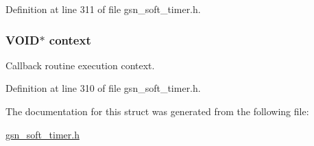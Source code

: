 Definition at line 311 of file gsn\_\-soft\_\-timer.h.

\hypertarget{a00228_a7e5a25499bcd2b9280a9b79d4c5b7975}{
\subsubsection[{context}]{\setlength{\rightskip}{0pt plus 5cm}VOID$\ast$ {\bf context}}}
\label{a00228_a7e5a25499bcd2b9280a9b79d4c5b7975}
Callback routine execution context. 

Definition at line 310 of file gsn\_\-soft\_\-timer.h.



The documentation for this struct was generated from the following file:\begin{DoxyCompactItemize}
\item 
\hyperlink{a00586}{gsn\_\-soft\_\-timer.h}\end{DoxyCompactItemize}
